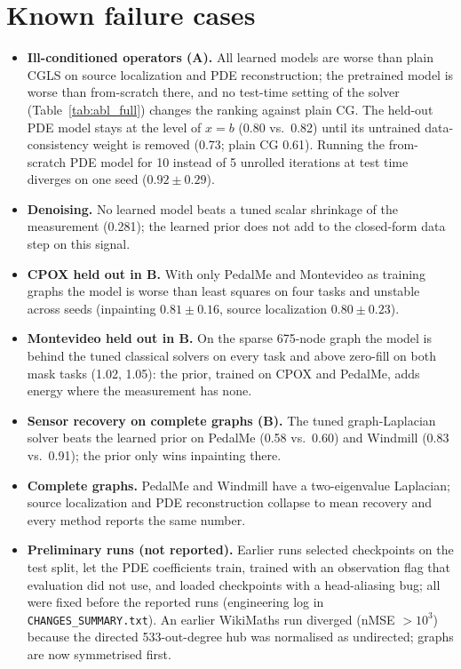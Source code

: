 \documentclass{article}
\begin{document}
\section{Known failure cases}
\label{app:fail}
\begin{itemize}\setlength{\itemsep}{1pt}
\item \textbf{Ill-conditioned operators (A).} All learned models are worse than plain CGLS on
source localization and PDE reconstruction; the pretrained model is worse than from-scratch there, and no
test-time setting of the solver (Table~\ref{tab:abl_full}) changes the ranking against plain CG. The held-out
PDE model stays at the level of $x = b$ (0.80 vs.\ 0.82) until its untrained data-consistency weight is removed
(0.73; plain CG 0.61). Running the from-scratch PDE model for 10 instead of 5 unrolled
iterations at test time diverges on one seed ($0.92 \pm 0.29$).
\item \textbf{Denoising.} No learned model beats a tuned scalar shrinkage of the measurement (0.281); the
learned prior does not add to the closed-form data step on this signal.
\item \textbf{CPOX held out in B.} With only PedalMe and Montevideo as training graphs the model is worse than
least squares on four tasks and unstable across seeds (inpainting $0.81 \pm 0.16$, source localization
$0.80 \pm 0.23$).
\item \textbf{Montevideo held out in B.} On the sparse 675-node graph the model is behind the tuned classical
solvers on every task and above zero-fill on both mask tasks (1.02, 1.05): the prior, trained on CPOX and
PedalMe, adds energy where the measurement has none.
\item \textbf{Sensor recovery on complete graphs (B).} The tuned graph-Laplacian solver beats the learned prior
on PedalMe (0.58 vs.\ 0.60) and Windmill (0.83 vs.\ 0.91); the prior only wins inpainting there.
\item \textbf{Complete graphs.} PedalMe and Windmill have a two-eigenvalue Laplacian; source localization and
PDE reconstruction collapse to mean recovery and every method reports the same number.
\item \textbf{Preliminary runs (not reported).} Earlier runs selected checkpoints on the test split, let the
PDE coefficients train, trained with an observation flag that evaluation did not use, and loaded checkpoints
with a head-aliasing bug; all were fixed before the reported runs (engineering log in
\texttt{CHANGES\_SUMMARY.txt}). An earlier WikiMaths run diverged (nMSE $> 10^{3}$) because the directed
533-out-degree hub was normalised as undirected; graphs are now symmetrised first.
\end{itemize}
\end{document}
